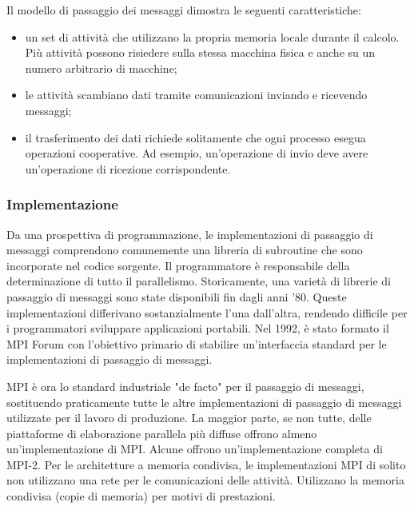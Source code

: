 Il modello di passaggio dei messaggi dimostra le seguenti
caratteristiche:
\begin{itemize}
	
	\item un set di attività che utilizzano la propria
	memoria locale durante il calcolo. Più
	attività possono risiedere sulla stessa
	macchina fisica e anche su un numero arbitrario
	di macchine;
	\item le attività scambiano dati tramite
	comunicazioni inviando e
	ricevendo messaggi;
	\item il trasferimento dei dati richiede solitamente
	che ogni processo esegua
	operazioni cooperative. Ad esempio, un'operazione di invio
	deve avere un'operazione di ricezione
	corrispondente.
\end{itemize}
\subsubsection*{Implementazione}
Da una prospettiva di programmazione, le implementazioni di passaggio di messaggi
comprendono comunemente una libreria di
subroutine che sono incorporate nel codice sorgente.
 Il programmatore è responsabile della determinazione di tutto
il parallelismo.
Storicamente, una varietà di librerie di passaggio di messaggi
sono state disponibili fin dagli anni '80.
 Queste implementazioni differivano sostanzialmente
l'una dall'altra, rendendo difficile per i programmatori sviluppare
applicazioni portabili.
Nel 1992, è stato formato il MPI Forum con l'obiettivo primario di stabilire un'interfaccia standard per le implementazioni di passaggio di messaggi.

MPI è ora lo standard industriale "de facto" per il passaggio di messaggi,
sostituendo praticamente tutte le altre implementazioni di passaggio di messaggi utilizzate
per il lavoro di produzione.
 La maggior parte, se non tutte, delle piattaforme di elaborazione parallela più diffuse offrono almeno
un'implementazione di MPI. Alcune offrono un'implementazione completa di MPI-2.
Per le architetture a memoria condivisa, le implementazioni MPI di solito non
utilizzano una rete per le comunicazioni delle attività. Utilizzano la memoria condivisa
(copie di memoria) per motivi di prestazioni.
